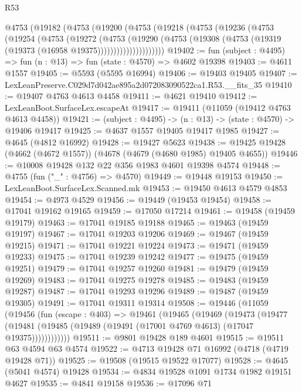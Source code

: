 \begin{lexlean}{R53}
\begin{coremodule}
      @4753
        (@19182
          (@4753
            (@19200
              (@4753
                (@19218
                  (@4753
                    (@19236
                      (@4753
                        (@19254
                          (@4753
                            (@19272
                              (@4753
                                (@19290
                                  (@4753
                                    (@19308
                                      (@4753 (@19319 (@19373 (@16958 @19375)))))))))))))))))))))
@19402 := fun (subject : @4495) => fun (n : @13) => fun (state : @4570) => @4602 @19398
@19403 := @4611 @1557
@19405 := @5593 (@5595 @16994)
@19406 := @19403 @19405
@19407 := LexLeanPreserve.C029d7d042ae895a2d072083090522ca1.R53.__fits_35
@19410 := @19407 @4763 @4613 @4458
@19411 := @4621 @19410
@19412 := LexLeanBoot.SurfaceLex.escapeAt
@19417 := @19411 (@11059 (@19412 @4763 @4613 @4458))
@19421 := (subject : @4495) -> (n : @13) -> (state : @4570) -> @19406 @19417
@19425 := @4637 @1557 @19405 @19417 @1985
@19427 := @4645 (@4812 @16992)
@19428 := @19427 @5623
@19438 := @19425 @19428 (@4662 (@4672 @1557)) (@4678 (@4679 (@4680 @1985) @19405 @4655))
@19446 := @10008 @19428 @132 @22 @356 @1983 @4601 @19398 @4574
@19448 := @4755 (fun ("_" : @4756) => @4570)
@19449 := @19448 @19153
@19450 := LexLeanBoot.SurfaceLex.Scanned.mk
@19453 := @19450 @4613 @4579 @4853
@19454 := @4973 @4529
@19456 := @19449 (@19453 @19454)
@19458 := @17041 @19162 @19165
@19459 := @17050 @17214
@19461 := @19458 (@19459 @19179)
@19463 := @17041 @19185 @19188
@19465 := @19463 (@19459 @19197)
@19467 := @17041 @19203 @19206
@19469 := @19467 (@19459 @19215)
@19471 := @17041 @19221 @19224
@19473 := @19471 (@19459 @19233)
@19475 := @17041 @19239 @19242
@19477 := @19475 (@19459 @19251)
@19479 := @17041 @19257 @19260
@19481 := @19479 (@19459 @19269)
@19483 := @17041 @19275 @19278
@19485 := @19483 (@19459 @19287)
@19487 := @17041 @19293 @19296
@19489 := @19487 (@19459 @19305)
@19491 := @17041 @19311 @19314
@19508 := @19446
    (@11059
      (@19456
        (fun (escape : @403) =>
        @19461
          (@19465
            (@19469
              (@19473
                (@19477
                  (@19481 (@19485 (@19489 (@19491 (@17001 @4769 @4613) (@17047 @19375))))))))))))
@19511 := @9801 @19428 @189 @4601
@19515 := @19511 @63 @4594 @63 @4574
@19522 := @4713 @19428 @71 @16992 (@4718 (@4719 @19428 @71))
@19525 := @19508 (@19515 @19522 @17077)
@19528 := @4645 (@5041 @4574) @19428
@19534 := @4834 @19528 @1091 @1734 @1982 @19151 @4627
@19535 := @4841 @19158
@19536 := @17096 @71

\end{coremodule}
\end{lexlean}
